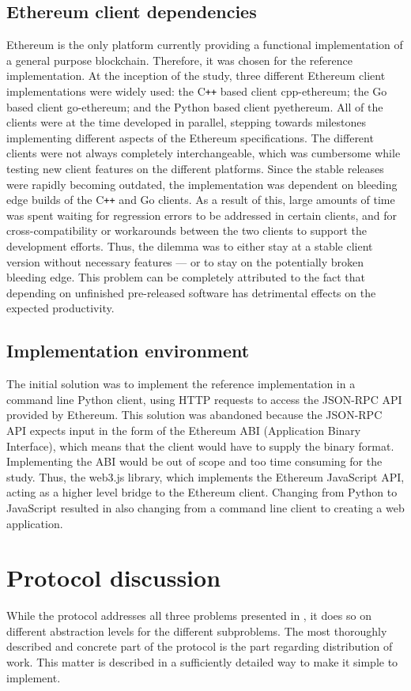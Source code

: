 \subsection{Ethereum client dependencies}
Ethereum is the only platform currently providing a functional implementation of a general purpose blockchain. Therefore, it was chosen  for the reference implementation. At the inception of the study, three different Ethereum client implementations were widely used: the C\texttt{++} based client cpp-ethereum; the Go based client go-ethereum; and the Python based client pyethereum. All of the clients were at the time developed in parallel, stepping towards milestones implementing different aspects of the Ethereum specifications. The different clients were not always completely interchangeable, which was cumbersome while testing new client features on the different platforms. Since the stable releases were rapidly becoming outdated, the implementation was dependent on bleeding edge builds of the C\texttt{++} and Go clients. As a result of this, large amounts of time was spent waiting for regression errors to be addressed in certain clients, and for cross-compatibility or workarounds between the two clients to support the development efforts. Thus, the dilemma was to either stay at a stable client version without necessary features --- or to stay on the potentially broken bleeding edge. This problem can be completely attributed to the fact that depending on unfinished pre-released software has detrimental effects on the expected productivity.

\subsection{Implementation environment}
The initial solution was to implement the reference implementation in a command line Python client, using HTTP requests to access the JSON-RPC API provided by Ethereum. This solution was abandoned because the JSON-RPC API expects input in the form of the Ethereum ABI (Application Binary Interface), which means that the client would have to supply the binary format. Implementing the ABI would be out of scope and too time consuming for the study. Thus, the web3.js library, which implements the Ethereum JavaScript API, acting as a higher level bridge to the Ethereum client. Changing from Python to JavaScript resulted in also changing from a command line client to creating a web application.

\section{Protocol discussion}
While the protocol addresses all three problems presented in , it does so on different abstraction levels for the different subproblems. The most thoroughly described and concrete part of the protocol is the part regarding distribution of work. This matter is described in a sufficiently detailed way to make it simple to implement.

